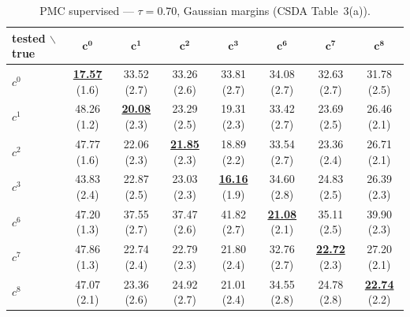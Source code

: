 \begin{table}[htbp]
  \centering
  \small
  \setlength{\tabcolsep}{4pt}
  \caption{PMC supervised — $\tau = 0.70$, Gaussian margins (CSDA Table~3(a)).}
  \label{tab:exp1-high_tau_gauss}
  \begin{tabular}{lccccccc}
    \toprule
    tested $\backslash$ true & $\mathbf{c^{0}}$ & $\mathbf{c^{1}}$ & $\mathbf{c^{2}}$ & $\mathbf{c^{3}}$ & $\mathbf{c^{6}}$ & $\mathbf{c^{7}}$ & $\mathbf{c^{8}}$ \\
    \midrule
    $c^{0}$ & \textbf{\underline{17.57}} (1.6) & 33.52 (2.7) & 33.26 (2.6) & 33.81 (2.7) & 34.08 (2.7) & 32.63 (2.7) & 31.78 (2.5) \\
    $c^{1}$ & 48.26 (1.2) & \textbf{\underline{20.08}} (2.3) & 23.29 (2.5) & 19.31 (2.3) & 33.42 (2.7) & 23.69 (2.5) & 26.46 (2.1) \\
    $c^{2}$ & 47.77 (1.6) & 22.06 (2.3) & \textbf{\underline{21.85}} (2.3) & 18.89 (2.2) & 33.54 (2.7) & 23.36 (2.4) & 26.71 (2.1) \\
    $c^{3}$ & 43.83 (2.4) & 22.87 (2.5) & 23.03 (2.3) & \textbf{\underline{16.16}} (1.9) & 34.60 (2.8) & 24.83 (2.5) & 26.39 (2.3) \\
    $c^{6}$ & 47.20 (1.3) & 37.55 (2.7) & 37.47 (2.6) & 41.82 (2.7) & \textbf{\underline{21.08}} (2.1) & 35.11 (2.5) & 39.90 (2.3) \\
    $c^{7}$ & 47.86 (1.3) & 22.74 (2.4) & 22.79 (2.3) & 21.80 (2.4) & 32.76 (2.7) & \textbf{\underline{22.72}} (2.3) & 27.20 (2.1) \\
    $c^{8}$ & 47.07 (2.1) & 23.36 (2.6) & 24.92 (2.7) & 21.01 (2.4) & 34.55 (2.8) & 24.78 (2.8) & \textbf{\underline{22.74}} (2.2) \\
    \bottomrule
  \end{tabular}
\end{table}
